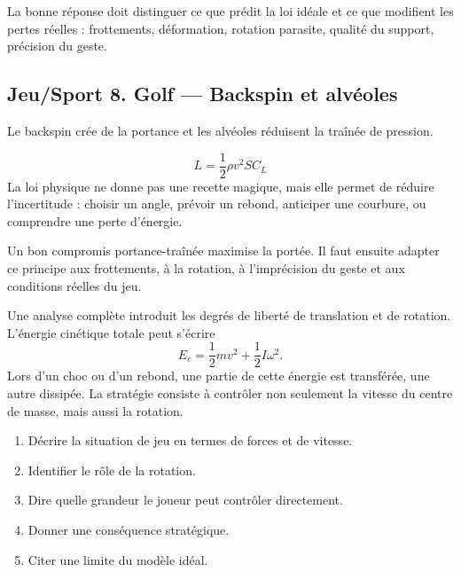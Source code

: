 \documentclass[11pt,a4paper]{article}
\begin{document}
\begin{corrigebox}[Indication]
La bonne réponse doit distinguer ce que prédit la loi idéale et ce que modifient les pertes réelles : frottements, déformation, rotation parasite, qualité du support, précision du geste.
\end{corrigebox}


\subsection{Jeu/Sport 8. Golf — Backspin et alvéoles}

\begin{exemplebox}[Observation]
Le backspin crée de la portance et les alvéoles réduisent la traînée de pression.
\end{exemplebox}

\begin{theorembox}
\[
L=\frac12\rho v^2SC_L
\]
La loi physique ne donne pas une recette magique, mais elle permet de réduire l'incertitude : choisir un angle, prévoir un rebond, anticiper une courbure, ou comprendre une perte d'énergie.
\end{theorembox}

\begin{methodebox}
Un bon compromis portance-traînée maximise la portée.
Il faut ensuite adapter ce principe aux frottements, à la rotation, à l'imprécision du geste et aux conditions réelles du jeu.
\end{methodebox}

\begin{approfondissementbox}
Une analyse complète introduit les degrés de liberté de translation et de rotation. L'énergie cinétique totale peut s'écrire
\[
E_c=\frac12mv^2+\frac12I\omega^2.
\]
Lors d'un choc ou d'un rebond, une partie de cette énergie est transférée, une autre dissipée. La stratégie consiste à contrôler non seulement la vitesse du centre de masse, mais aussi la rotation.
\end{approfondissementbox}

\begin{exercicebox}
\begin{enumerate}
  \item Décrire la situation de jeu en termes de forces et de vitesse.
  \item Identifier le rôle de la rotation.
  \item Dire quelle grandeur le joueur peut contrôler directement.
  \item Donner une conséquence stratégique.
  \item Citer une limite du modèle idéal.
\end{enumerate}
\end{exercicebox}
\end{document}
